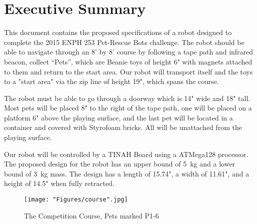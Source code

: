 \documentclass[11pt, oneside]{article} %
\begin{document}
\section*{Executive Summary}
This document contains the proposed specifications of a robot designed to complete the 2015 ENPH 253 Pet-Rescue Bots challenge. The robot should be able to navigate through an 8' by 8' course by following a tape path and infrared beacon, collect ``Pets'', which are Beanie toys of height 6" with magnets attached to them and return to the start area. Our robot will transport itself and the toys to a "start area" via the zip line of height 19", which spans the course.

The robot must be able to go through a doorway which is 14" wide and 18" tall. Most pets will be placed 8" to the right of the tape path, one will be placed on a platform 6" above the playing surface, and the last pet will be located in a container and covered with Styrofoam bricks. All will be unattached from the playing surface.

Our robot will be controlled by a TINAH Board using a ATMega128 processor. The proposed design for the robot has an upper bound of 5~kg and a lower bound of 3~kg mass. The design has a length of 15.74", a width of 11.61", and a height of 14.5" when fully retracted.

\begin{figure*}[h]
	\centering
	\texttt{[image: "Figures/course".jpg]}
	\caption*{The Competition Course, Pets marked P1-6}
\end{figure*}

\newpage


\tableofcontents %
\newpage
\listoffigures %
\listoftables %


\newpage
\end{document}
